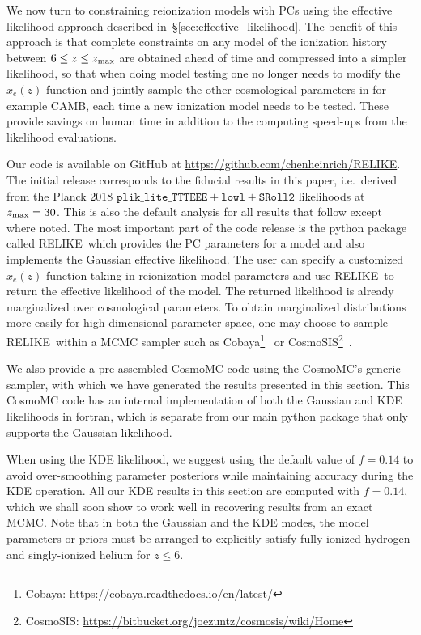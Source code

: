 \documentclass[prd,twocolumn,amsmath,amssymb,floatfix,superscriptaddress,nofootinbib]{revtex4-1}
\newcommand{\zmax}{z_{\rm max}}
\newcommand{\relike}{RELIKE}%
\begin{document}
We now turn to constraining reionization models with PCs using the
effective likelihood approach described in~\S\ref{sec:effective_likelihood}.  The benefit of this approach is that
complete constraints on any model of the ionization history  between $6 \leq z \leq \zmax$ are obtained ahead of time and compressed into a simpler likelihood, so that when doing model testing one no longer needs to modify the $x_e(z)$ function and jointly sample the other cosmological parameters in for example CAMB, each time a new ionization model needs to be tested. These provide savings on human time in addition to the computing speed-ups from the likelihood evaluations.

Our code is available on GitHub at {\url{https://github.com/chenheinrich/RELIKE}}. The initial release corresponds to the fiducial results in this paper, i.e.\ derived from the Planck 2018 $\texttt{plik\_lite\_TTTEEE} + \texttt{lowl} + \texttt{SRoll2}$ likelihoods at $\zmax = 30$.  
This is also the default analysis for all results that follow except where noted.
The most important part of the code release is the python package called \relike\  which provides the PC parameters for a model and also implements the Gaussian effective likelihood. The user can specify a customized $x_e(z)$ function taking in reionization model parameters and use \relike\  to return the effective likelihood of the model. The returned likelihood is already marginalized over cosmological parameters. 
To obtain marginalized distributions more easily for high-dimensional parameter space, one may choose to sample \relike\ within a MCMC sampler such as Cobaya\footnote{Cobaya: \url{https://cobaya.readthedocs.io/en/latest/}}~\cite{Torrado:2020dgo,2020arXiv200505290T} or CosmoSIS\footnote{CosmoSIS: \url{https://bitbucket.org/joezuntz/cosmosis/wiki/Home}}~\cite{Zuntz:2014csq}.


We also provide a pre-assembled CosmoMC code using the CosmoMC's generic sampler, with which we have generated the results presented in this section. This CosmoMC code has an internal  implementation of both the Gaussian and KDE likelihoods in fortran, which is separate from our main python package that only supports the Gaussian likelihood. 

When using the KDE likelihood, we suggest using the default value of $f = 0.14$ to avoid over-smoothing parameter posteriors while maintaining accuracy during the KDE operation. All our KDE results in this section are computed with $f = 0.14$, which we shall soon show to work well in recovering results from an exact MCMC. Note that in both the Gaussian and the KDE modes, the model parameters or priors must be arranged to explicitly satisfy fully-ionized hydrogen and singly-ionized helium for $z\leq 6$. 
\end{document}
